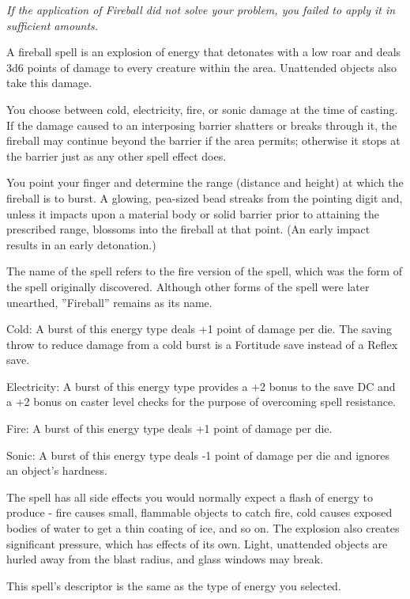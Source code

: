 \emph{If the application of Fireball did not solve your problem, you failed to apply it in sufficient amounts.}

A fireball spell is an explosion of energy that detonates with a low roar and deals 3d6 points of damage to every creature within the area. 
Unattended objects also take this damage. 

You choose between cold, electricity, fire, or sonic damage at the time of casting.
If the damage caused to an interposing barrier shatters or breaks through it, the fireball may continue beyond the barrier if the area permits; 
otherwise it stops at the barrier just as any other spell effect does. 

You point your finger and determine the range (distance and height) at which the fireball is to burst. 
A glowing, pea-sized bead streaks from the pointing digit and, unless it impacts upon a material body or solid barrier prior to attaining the prescribed range, 
blossoms into the fireball at that point. (An early impact results in an early detonation.)

The name of the spell refers to the fire version of the spell, which was the form of the spell originally discovered.
Although other forms of the spell were later unearthed, ''Fireball'' remains as its name.
\begin{list}{}{\leftmargin=1em}
 \item Cold: A burst of this energy type deals +1 point of damage per die. 
 The saving throw to reduce damage from a cold burst is a Fortitude save instead of a Reflex save.
 \item Electricity: A burst of this energy type provides a +2 bonus to the save DC
 and a +2 bonus on caster level checks for the purpose of overcoming spell resistance.
 \item Fire: A burst of this energy type deals +1 point of damage per die.
 \item Sonic: A burst of this energy type deals -1 point of damage per die and ignores an object's hardness.
\end{list}
The spell has all side effects you would normally expect a flash of energy to produce - fire causes small, flammable objects to catch fire, cold causes exposed bodies of water to get a thin coating of ice, and so on.
The explosion also creates significant pressure, which has effects of its own. 
Light, unattended objects are hurled away from the blast radius, and glass windows may break.

This spell's descriptor is the same as the type of energy you selected. 

